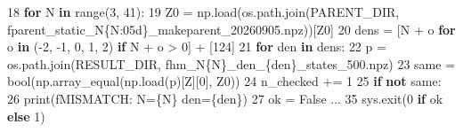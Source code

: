 \documentclass[
  a4paper,
]{ltjsarticle}
\newenvironment{Shaded}{}{}
\newcommand{\BuiltInTok}[1]{\textcolor[rgb]{0.00,0.50,0.00}{#1}}
\newcommand{\ControlFlowTok}[1]{\textcolor[rgb]{0.00,0.44,0.13}{\textbf{#1}}}
\newcommand{\DecValTok}[1]{\textcolor[rgb]{0.25,0.63,0.44}{#1}}
\newcommand{\KeywordTok}[1]{\textcolor[rgb]{0.00,0.44,0.13}{\textbf{#1}}}
\newcommand{\NormalTok}[1]{#1}
\newcommand{\OperatorTok}[1]{\textcolor[rgb]{0.40,0.40,0.40}{#1}}
\newcommand{\SpecialCharTok}[1]{\textcolor[rgb]{0.25,0.44,0.63}{#1}}
\newcommand{\SpecialStringTok}[1]{\textcolor[rgb]{0.73,0.40,0.53}{#1}}
\newcommand{\StringTok}[1]{\textcolor[rgb]{0.25,0.44,0.63}{#1}}
\newcommand{\VariableTok}[1]{\textcolor[rgb]{0.10,0.09,0.49}{#1}}
\begin{document}
\begin{Shaded}
\begin{Highlighting}[]
    \DecValTok{18}  \ControlFlowTok{for}\NormalTok{ N }\KeywordTok{in} \BuiltInTok{range}\NormalTok{(}\DecValTok{3}\NormalTok{, }\DecValTok{41}\NormalTok{):}
    \DecValTok{19}\NormalTok{      Z0 }\OperatorTok{=}\NormalTok{ np.load(os.path.join(PARENT\_DIR, }\SpecialStringTok{f\textquotesingle{}parent\_static\_N}\SpecialCharTok{\{}\NormalTok{N}\SpecialCharTok{:05d\}}\SpecialStringTok{\_makeparent\_20260905.npz\textquotesingle{}}\NormalTok{))[}\StringTok{\textquotesingle{}Z0\textquotesingle{}}\NormalTok{]}
    \DecValTok{20}\NormalTok{      dens }\OperatorTok{=}\NormalTok{ [N }\OperatorTok{+}\NormalTok{ o }\ControlFlowTok{for}\NormalTok{ o }\KeywordTok{in}\NormalTok{ (}\OperatorTok{{-}}\DecValTok{2}\NormalTok{, }\OperatorTok{{-}}\DecValTok{1}\NormalTok{, }\DecValTok{0}\NormalTok{, }\DecValTok{1}\NormalTok{, }\DecValTok{2}\NormalTok{) }\ControlFlowTok{if}\NormalTok{ N }\OperatorTok{+}\NormalTok{ o }\OperatorTok{\textgreater{}} \DecValTok{0}\NormalTok{] }\OperatorTok{+}\NormalTok{ [}\DecValTok{124}\NormalTok{]}
    \DecValTok{21}      \ControlFlowTok{for}\NormalTok{ den }\KeywordTok{in}\NormalTok{ dens:}
    \DecValTok{22}\NormalTok{          p }\OperatorTok{=}\NormalTok{ os.path.join(RESULT\_DIR, }\SpecialStringTok{f\textquotesingle{}hm\_N}\SpecialCharTok{\{}\NormalTok{N}\SpecialCharTok{\}}\SpecialStringTok{\_den\_}\SpecialCharTok{\{}\NormalTok{den}\SpecialCharTok{\}}\SpecialStringTok{\_states\_500.npz\textquotesingle{}}\NormalTok{)}
    \DecValTok{23}\NormalTok{          same }\OperatorTok{=} \BuiltInTok{bool}\NormalTok{(np.array\_equal(np.load(p)[}\StringTok{\textquotesingle{}Z\textquotesingle{}}\NormalTok{][}\DecValTok{0}\NormalTok{], Z0))}
    \DecValTok{24}\NormalTok{          n\_checked }\OperatorTok{+=} \DecValTok{1}
    \DecValTok{25}          \ControlFlowTok{if} \KeywordTok{not}\NormalTok{ same:}
    \DecValTok{26}              \BuiltInTok{print}\NormalTok{(}\SpecialStringTok{f\textquotesingle{}MISMATCH: N=}\SpecialCharTok{\{}\NormalTok{N}\SpecialCharTok{\}}\SpecialStringTok{ den=}\SpecialCharTok{\{}\NormalTok{den}\SpecialCharTok{\}}\SpecialStringTok{\textquotesingle{}}\NormalTok{)}
    \DecValTok{27}\NormalTok{              ok }\OperatorTok{=} \VariableTok{False}
\NormalTok{...}
    \DecValTok{35}\NormalTok{  sys.exit(}\DecValTok{0} \ControlFlowTok{if}\NormalTok{ ok }\ControlFlowTok{else} \DecValTok{1}\NormalTok{)}
\end{Highlighting}
\end{Shaded}
\end{document}
